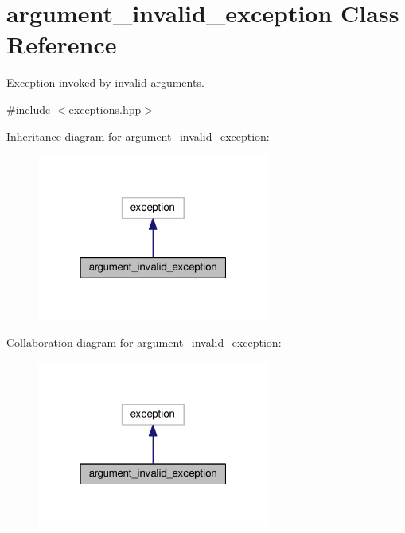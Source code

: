 \hypertarget{classargument__invalid__exception}{}\section{argument\+\_\+invalid\+\_\+exception Class Reference}
\label{classargument__invalid__exception}


Exception invoked by invalid arguments.  




{\ttfamily \#include $<$exceptions.\+hpp$>$}



Inheritance diagram for argument\+\_\+invalid\+\_\+exception\+:\nopagebreak
\begin{figure}[H]
\begin{center}
\leavevmode
\includegraphics[width=217pt]{classargument__invalid__exception__inherit__graph}
\end{center}
\end{figure}


Collaboration diagram for argument\+\_\+invalid\+\_\+exception\+:\nopagebreak
\begin{figure}[H]
\begin{center}
\leavevmode
\includegraphics[width=217pt]{classargument__invalid__exception__coll__graph}
\end{center}
\end{figure}
